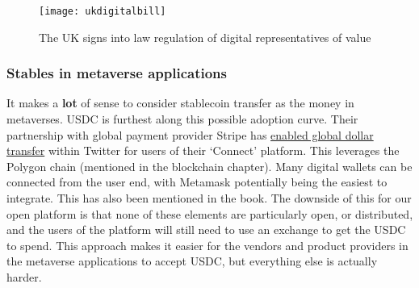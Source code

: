 \begin{itemize}
\begin{figure}
  \centering
    \texttt{[image: ukdigitalbill]}
  \caption{The UK signs into law regulation of digital representatives of value}
  \label{fig:ukdigitalbill}
\end{figure}

\subsubsection{Stables in metaverse applications}
It makes a \textbf{lot} of sense to consider stablecoin transfer as the money in metaverses. USDC is furthest along this possible adoption curve. Their partnership with global payment provider Stripe has \href{https://stripe.com/blog/expanding-global-payouts-with-crypto}{enabled global dollar transfer} within Twitter for users of their `Connect' platform. This leverages the Polygon chain (mentioned in the blockchain chapter). Many digital wallets can be connected from the user end, with Metamask potentially being the easiest to integrate. This has also been mentioned in the book. The downside of this for our open platform is that none of these elements are particularly open, or distributed, and the users of the platform will still need to use an exchange to get the USDC to spend. This approach makes it easier for the vendors and product providers in the metaverse applications to accept USDC, but everything else is actually harder.


\end{itemize}
